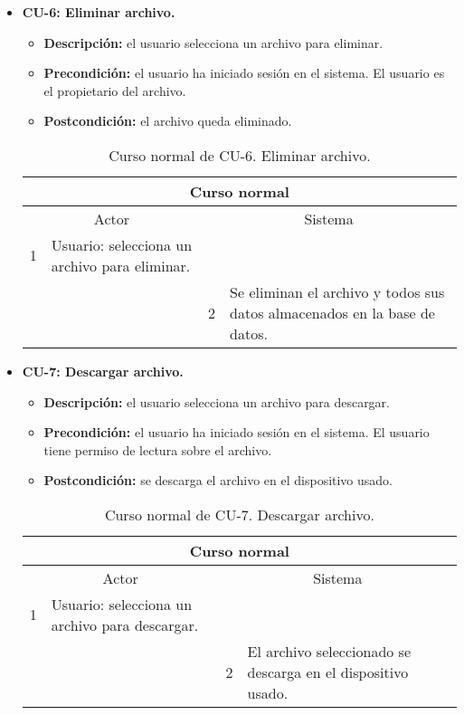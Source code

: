 \begin{itemize}
	\item \textbf{CU-6: Eliminar archivo.}
	\begin{itemize}
		\item \textbf{Descripción:} el usuario selecciona un archivo para eliminar.
		\item \textbf{Precondición:} el usuario ha iniciado sesión en el sistema. El usuario es el propietario del archivo.
		\item \textbf{Postcondición:} el archivo queda eliminado.
	\end{itemize}
	\begin{table}[H]
		\centering
		\begin{tabular}{|p{0.3cm}|p{5cm}|p{0.3cm}|p{5cm}|}
			\hline
			\multicolumn{4}{|c|}{Curso normal} \\ \hline
			\multicolumn{2}{|c|}{Actor} & \multicolumn{2}{|c|}{Sistema} \\ \hline
			1 & Usuario: selecciona un archivo para eliminar. &  &  \\ \hline
			&  & 2 & Se eliminan el archivo y todos sus datos almacenados en la base de datos. \\ \hline
		\end{tabular}
		\caption{Curso normal de CU-6. Eliminar archivo.}
		\label{tabla:cu6-normal}
	\end{table}
\end{itemize}

\begin{itemize}
	\item \textbf{CU-7: Descargar archivo.}
	\begin{itemize}
		\item \textbf{Descripción:} el usuario selecciona un archivo para descargar.
		\item \textbf{Precondición:} el usuario ha iniciado sesión en el sistema. El usuario tiene permiso de lectura sobre el archivo.
		\item \textbf{Postcondición:} se descarga el archivo en el dispositivo usado.
	\end{itemize}
	\begin{table}[H]
		\centering
		\begin{tabular}{|p{0.3cm}|p{5cm}|p{0.3cm}|p{5cm}|}
			\hline
			\multicolumn{4}{|c|}{Curso normal} \\ \hline
			\multicolumn{2}{|c|}{Actor} & \multicolumn{2}{|c|}{Sistema} \\ \hline
			1 & Usuario: selecciona un archivo para descargar. &  &  \\ \hline
			&  & 2 & El archivo seleccionado se descarga en el dispositivo usado. \\ \hline
		\end{tabular}
		\caption{Curso normal de CU-7. Descargar archivo.}
		\label{tabla:cu7-normal}
	\end{table}
\end{itemize}

